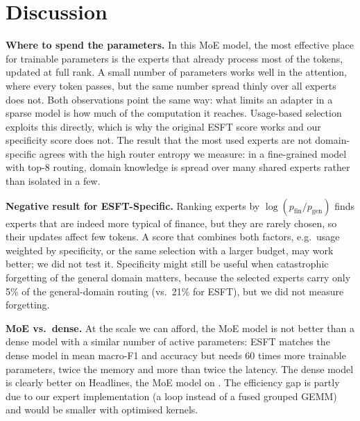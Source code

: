 \section{Discussion}

\textbf{Where to spend the parameters.} In this MoE model, the most effective place for
trainable parameters is the experts that already process most of the tokens, updated at full
rank. A small number of parameters works well in the attention, where every token passes,
but the same number spread thinly over all experts does not. Both observations point the
same way: what limits an adapter in a sparse model is how much of the computation it reaches.
Usage-based selection exploits this directly, which is why the original ESFT score works and
our specificity score does not. The result that the most used experts are not
domain-specific agrees with the high router entropy we measure: in a fine-grained model with
top-8 routing, domain knowledge is spread over many shared experts rather than isolated in a
few.

\textbf{Negative result for ESFT-Specific.} Ranking experts by $\log(p_\text{fin}/p_\text{gen})$
finds experts that are indeed more typical of finance, but they are rarely chosen, so their
updates affect few tokens. A score that combines both factors, e.g.\ usage weighted by
specificity, or the same selection with a larger budget, may work better; we did not test it.
Specificity might still be useful when catastrophic forgetting of the general domain matters,
because the selected experts carry only 5\% of the general-domain routing (vs.\ 21\% for ESFT),
but we did not measure forgetting.

\textbf{MoE vs.\ dense.} At the scale we can afford, the MoE model is not better than a dense
model with a similar number of active parameters: ESFT matches the dense model in mean
macro-F1 and accuracy but needs 60 times more trainable parameters, twice the memory and more than
twice the latency. The dense model is clearly better on Headlines, the MoE model on \fiqa{}. The
efficiency gap is partly due to our expert implementation (a loop instead of a fused grouped
GEMM) and would be smaller with optimised kernels.

